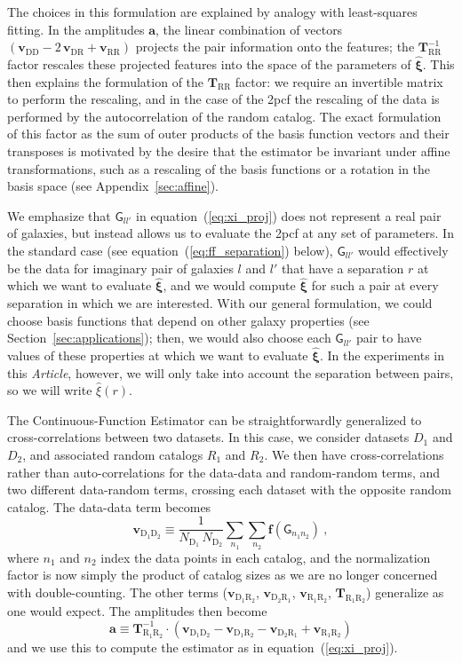 \documentclass[modern]{aastex62}
\newcommand{\cf}{2pcf\xspace} %
\newcommand{\Est}{The Continuous-Function Estimator\xspace}
\newcommand{\documentname}{\textsl{Article}\xspace}
\newcommand{\eqt}[1]{equation~(\ref{#1})}
\newcommand{\inv}{^{-1}}
\newcommand{\bld}[1]{\bm{#1}} %
\newcommand{\vv}[1]{\bld{v}_\mathrm{#1}}
\newcommand{\TT}[1]{\bld{T}_\mathrm{#1}}
\newcommand{\ff}{\bld{f}}
\newcommand{\NN}[1]{N_\mathrm{#1}}
\newcommand{\GG}[1]{\mathsf{G}_{#1}}
\begin{document}
The choices in this formulation are explained by analogy with least-squares fitting.
In the amplitudes $\bld{a}$, the linear combination of vectors $(\vv{DD} - 2\,\vv{DR} + \vv{RR})$ projects the pair information onto the features; the $\TT{RR}\inv$ factor rescales these projected features into the space of the parameters of $\bld{\hat{\xi}}$.
This then explains the formulation of the $\TT{RR}$ factor: we require an invertible matrix to perform the rescaling, and in the case of the \cf the rescaling of the data is performed by the autocorrelation of the random catalog.
The exact formulation of this factor as the sum of outer products of the basis function vectors and their transposes is motivated by the desire that the estimator be invariant under affine transformations, such as a rescaling of the basis functions or a rotation in the basis space (see Appendix~\ref{sec:affine}).

We emphasize that $\GG{ll'}$ in \eqt{eq:xi_proj} does not represent a real pair of galaxies, but instead allows us to evaluate the \cf at any set of parameters.
In the standard case (see \eqt{eq:ff_separation} below), $\GG{ll'}$ would effectively be the data for imaginary pair of galaxies $l$ and $l'$ that have a separation $r$ at which we want to evaluate $\bld{\hat{\xi}}$, and we would compute $\bld{\hat{\xi}}$ for such a pair at every separation in which we are interested.
With our general formulation, we could choose basis functions that depend on other galaxy properties (see Section~\ref{sec:applications}); then, we would also choose each $\GG{ll'}$ pair to have values of these properties at which we want to evaluate $\bld{\hat{\xi}}$.
In the experiments in this \documentname, however, we will only take into account the separation between pairs, so we will write $\hat{\xi}(r)$.

\Est can be straightforwardly generalized to cross-correlations between two datasets.
In this case, we consider datasets $D_1$ and $D_2$, and associated random catalogs $R_1$ and $R_2$. 
We then have cross-correlations rather than auto-correlations for the data-data and random-random terms, and two different data-random terms, crossing each dataset with the opposite random catalog. 
The data-data term becomes 
\begin{equation}
    \vv{D_1 D_2} \equiv \frac{1}{\NN{D_1}\,\NN{D_2}} \sum_{n_1} \sum_{n_2} \ff(\GG{n_1 n_2}) ~,
\end{equation}
where $n_1$ and $n_2$ index the data points in each catalog, and the normalization factor is now simply the product of catalog sizes as we are no longer concerned with double-counting.
The other terms ($\vv{D_1 R_2}$, $\vv{D_2 R_1}$, $\vv{R_1 R_2}$, $\TT{R_1 R_2}$) generalize as one would expect.
The amplitudes then become
\begin{equation}\displaystyle
    \bld{a} \equiv \TT{R_1 R_2}\inv \cdot (\vv{D_1 D_2} - \vv{D_1 R_2} - \vv{D_2 R_1} + \vv{R_1 R_2})
 \end{equation}
and we use this to compute the estimator as in \eqt{eq:xi_proj}.
\end{document}
